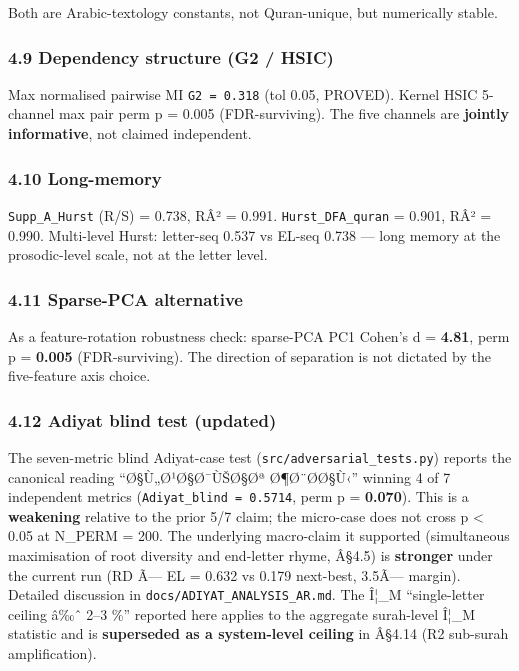 \documentclass[
]{article}
\begin{document}
Both are Arabic-textology constants, not Quran-unique, but numerically
stable.

\subsubsection{4.9 Dependency structure (G2 /
HSIC)}\label{dependency-structure-g2-hsic}

Max normalised pairwise MI \texttt{G2\ =\ 0.318} (tol 0.05, PROVED).
Kernel HSIC 5-channel max pair perm p = 0.005 (FDR-surviving). The five
channels are \textbf{jointly informative}, not claimed independent.

\subsubsection{4.10 Long-memory}\label{long-memory}

\texttt{Supp\_A\_Hurst} (R/S) = 0.738, RÂ² = 0.991.
\texttt{Hurst\_DFA\_quran} = 0.901, RÂ² = 0.990. Multi-level Hurst:
letter-seq 0.537 vs EL-seq 0.738 --- long memory at the prosodic-level
scale, not at the letter level.

\subsubsection{4.11 Sparse-PCA
alternative}\label{sparse-pca-alternative}

As a feature-rotation robustness check: sparse-PCA PC1 Cohen's d =
\textbf{4.81}, perm p = \textbf{0.005} (FDR-surviving). The direction of
separation is not dictated by the five-feature axis choice.

\subsubsection{4.12 Adiyat blind test
(updated)}\label{adiyat-blind-test-updated}

The seven-metric blind Adiyat-case test
(\texttt{src/adversarial\_tests.py}) reports the canonical reading
``Ø§Ù„Ø¹Ø§Ø¯ÙŠØ§Øª Ø¶Ø¨Ø\-Ø§Ù‹'' winning 4 of 7 independent metrics
(\texttt{Adiyat\_blind\ =\ 0.5714}, perm p = \textbf{0.070}). This is a
\textbf{weakening} relative to the prior 5/7 claim; the micro-case does
not cross p \textless{} 0.05 at N\_PERM = 200. The underlying
macro-claim it supported (simultaneous maximisation of root diversity
and end-letter rhyme, Â§4.5) is \textbf{stronger} under the current run
(RD Ã--- EL = 0.632 vs 0.179 next-best, 3.5Ã--- margin). Detailed
discussion in \texttt{docs/ADIYAT\_ANALYSIS\_AR.md}. The Î¦\_M
``single-letter ceiling â‰ˆ 2--3 \%'' reported here applies to the
aggregate surah-level Î¦\_M statistic and is \textbf{superseded as a
system-level ceiling} in Â§4.14 (R2 sub-surah amplification).
\end{document}
